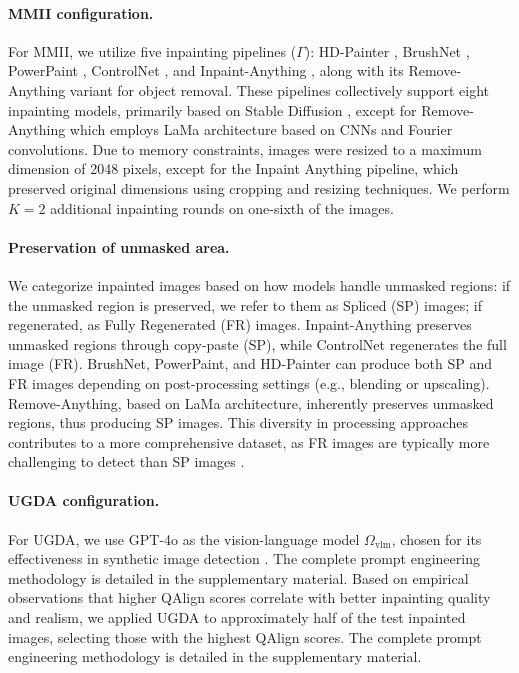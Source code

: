 \paragraph{MMII configuration.}
For MMII, we utilize five inpainting pipelines ($\Gamma$): HD-Painter \cite{manukyan2024hdpainter}, BrushNet \cite{ju2024brushnetplugandplayimageinpainting}, PowerPaint \cite{zhuang2024powerpaint}, ControlNet \cite{zhang2023addingconditionalcontroltexttoimage}, and Inpaint-Anything \cite{yu2023inpaintanythingsegmentmeets}, along with its Remove-Anything variant for object removal. These pipelines collectively support eight inpainting models, primarily based on Stable Diffusion \cite{rombach2022stablediffusion}, except for Remove-Anything which employs LaMa architecture \cite{suvorov2021lama} based on CNNs and Fourier convolutions. Due to memory constraints, images were resized to a maximum dimension of 2048 pixels, except for the Inpaint Anything pipeline, which preserved original dimensions using cropping and resizing techniques. We perform $K=2$ additional inpainting rounds on one-sixth of the images. 
\vspace{-14pt} 
\paragraph{Preservation of unmasked area.}
We categorize inpainted images based on how models handle unmasked regions: if the unmasked region is preserved, we refer to them as Spliced (SP) images; if regenerated, as Fully Regenerated (FR) images. Inpaint-Anything preserves unmasked regions through copy-paste (SP), while ControlNet regenerates the full image (FR). BrushNet, PowerPaint, and HD-Painter can produce both SP and FR images depending on post-processing settings (e.g., blending or upscaling). Remove-Anything, based on LaMa architecture, inherently preserves unmasked regions, thus producing SP images. This diversity in processing approaches contributes to a more comprehensive dataset, as FR images are typically more challenging to detect than SP images \cite{tailanian2024diffusionmodelsmeetimage}.
\vspace{-14pt} 
\paragraph{UGDA configuration.}
For UGDA, we use GPT-4o \cite{openai2023chatgpt4} as the vision-language model $\Omega_\text{vlm}$, chosen for its effectiveness in synthetic image detection \cite{ye2024lokicomprehensivesyntheticdata}. The complete prompt engineering methodology is detailed in the supplementary material. Based on empirical observations that higher QAlign scores correlate with better inpainting quality and realism, we applied UGDA to approximately half of the test inpainted images, selecting those with the highest QAlign scores. The complete prompt engineering methodology is detailed in the supplementary material.
\vspace{-14pt} 

